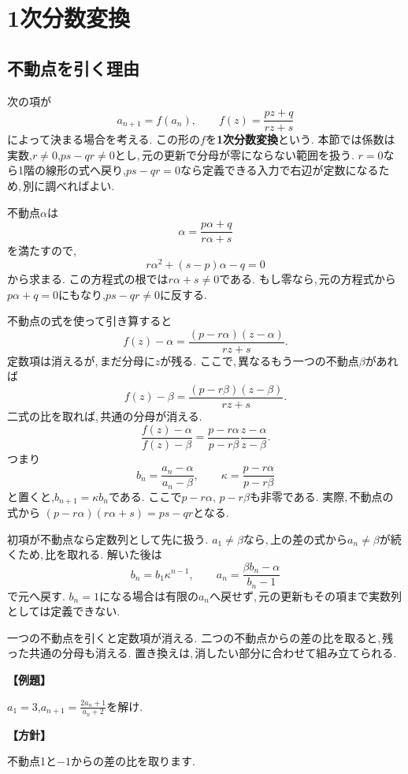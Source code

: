 \section{1次分数変換}\label{節：一次分数変換}
\subsection{不動点を引く理由}

次の項が
\[
 a_{n+1}=f(a_n),\qquad
 f(z)=\frac{pz+q}{rz+s}
\]
によって決まる場合を考える.
この形の$f$を\textbf{1次分数変換}という.
本節では係数は実数,$r\ne0$,$ps-qr\ne0$とし,\,元の更新で分母が零にならない範囲を扱う.
$r=0$なら1階の線形の式へ戻り,$ps-qr=0$なら定義できる入力で右辺が定数になるため,\,別に調べればよい.

不動点$\alpha$は
\[
 \alpha=\frac{p\alpha+q}{r\alpha+s}
\]
を満たすので,
\[
 r\alpha^2+(s-p)\alpha-q=0
\]
から求まる.
この方程式の根では$r\alpha+s\ne0$である.
もし零なら,\,元の方程式から$p\alpha+q=0$にもなり,$ps-qr\ne0$に反する.

不動点の式を使って引き算すると
\[
 f(z)-\alpha
 =\frac{(p-r\alpha)(z-\alpha)}{rz+s}.
\]
定数項は消えるが,\,まだ分母に$z$が残る.
ここで,\,異なるもう一つの不動点$\beta$があれば
\[
 f(z)-\beta
 =\frac{(p-r\beta)(z-\beta)}{rz+s}.
\]
二式の比を取れば,\,共通の分母が消える.
\[
 \frac{f(z)-\alpha}{f(z)-\beta}
 =\frac{p-r\alpha}{p-r\beta}
  \frac{z-\alpha}{z-\beta}.
\]
つまり
\[
 b_n=\frac{a_n-\alpha}{a_n-\beta},\qquad
 \kappa=\frac{p-r\alpha}{p-r\beta}
\]
と置くと,$b_{n+1}=\kappa b_n$である.
ここで$p-r\alpha,\,p-r\beta$も非零である.
実際,\,不動点の式から
$(p-r\alpha)(r\alpha+s)=ps-qr$となる.

初項が不動点なら定数列として先に扱う.
$a_1\ne\beta$なら,\,上の差の式から$a_n\ne\beta$が続くため,\,比を取れる.
解いた後は
\[
 b_n=b_1\kappa^{n-1},\qquad
 a_n=\frac{\beta b_n-\alpha}{b_n-1}
\]
で元へ戻す.
$b_n=1$になる場合は有限の$a_n$へ戻せず,\,元の更新もその項まで実数列としては定義できない.

\begin{bookpoint}
一つの不動点を引くと定数項が消える.
二つの不動点からの差の比を取ると,\,残った共通の分母も消える.
置き換えは,\,消したい部分に合わせて組み立てられる.
\end{bookpoint}

\noindent\textbf{【例題】}\par\nobreak
$a_1=3$,$a_{n+1}=\frac{2a_n+1}{a_n+2}$を解け.

\noindent\textbf{【方針】}\par\nobreak
不動点1と$-1$からの差の比を取ります.

